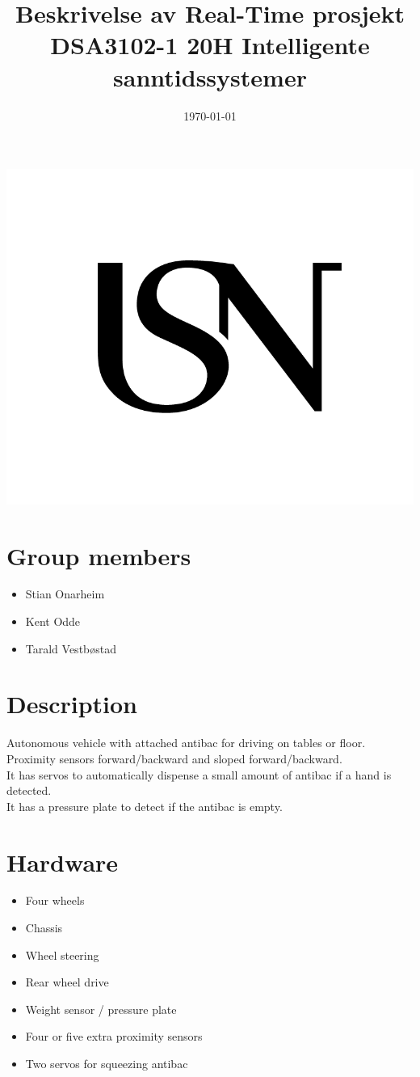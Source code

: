 \documentclass{article}
\title{Beskrivelse av Real-Time prosjekt \large\\
DSA3102-1 20H Intelligente sanntidssystemer}
\date{\today}
\begin{document}
\maketitle
\thispagestyle{empty}
\begin{center}
\includegraphics[width=\linewidth,height=0.2\textheight,keepaspectratio]{img/USN.png}
\end{center}


\newpage
\section{Group members}
	\begin{itemize}
		\item{Stian Onarheim}
		\item{Kent Odde}
		\item{Tarald Vestbøstad}
	\end{itemize}
\section{Description}
	Autonomous vehicle with attached antibac for driving on tables or floor.\\
	Proximity sensors forward/backward and sloped forward/backward.\\
	It has servos to automatically dispense a small amount of antibac if a hand is detected.\\
	It has a pressure plate to detect if the antibac is empty.
\section{Hardware}
	\begin{itemize}
		\item{Four wheels}
		\item{Chassis}
		\item{Wheel steering}
		\item{Rear wheel drive}
		\item{Weight sensor / pressure plate}
		\item{Four or five extra proximity sensors}
		\item{Two servos for squeezing antibac}
	\end{itemize}
\end{document}
